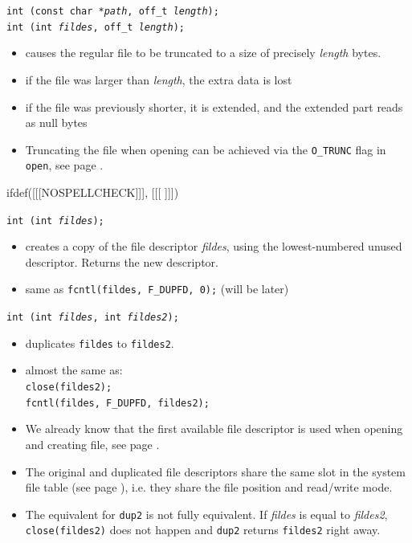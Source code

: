 \begin{slide}
\texttt{int (const char *\emph{path}, off\_t \emph{length});\\
int (int \emph{fildes}, off\_t \emph{length});}
\begin{itemize}
\item causes the regular file to be truncated to a size of precisely
\emph{length} bytes.
\item if the file was larger than \emph{length}, the extra data is lost
\item if the file was previously shorter, it is extended, and the extended part
reads as null bytes
\end{itemize}
\end{slide}

\begin{itemize}
\item Truncating the file when opening  can be achieved via the
\texttt{O\_TRUNC} flag in \texttt{open}, see page \pageref{OPEN}.
\end{itemize}


ifdef([[[NOSPELLCHECK]]], [[[
]]])

\begin{slide}
\texttt{int (int \emph{fildes});}
\begin{itemize}
\item creates a copy of the file descriptor \emph{fildes}, using the
lowest-numbered unused descriptor.  Returns the new descriptor.
\item same as \texttt{fcntl(fildes, F\_DUPFD, 0);} (will be later)
\end{itemize}
\texttt{int (int \emph{fildes}, int \emph{fildes2});}
\begin{itemize}
\item duplicates \texttt{fildes} to \texttt{fildes2}.
\item almost the same as:\\
\texttt{close(fildes2);\\ fcntl(fildes, F\_DUPFD, fildes2);}
\end{itemize}
\end{slide}


\begin{itemize}
\item We already know that the first available file descriptor is used when
opening and creating file, see page \pageref{OPEN}.
\item The original and duplicated file descriptors share the same slot in the
system file table (see page \pageref{OPENFILETABLES}), i.e. they share the file
position and read/write mode.
\item The equivalent for \texttt{dup2} is not fully equivalent.  If
\emph{fildes} is equal to \emph{fildes2}, \texttt{close(fildes2)} does not
happen and \texttt{dup2} returns \texttt{fildes2} right away.
\end{itemize}

